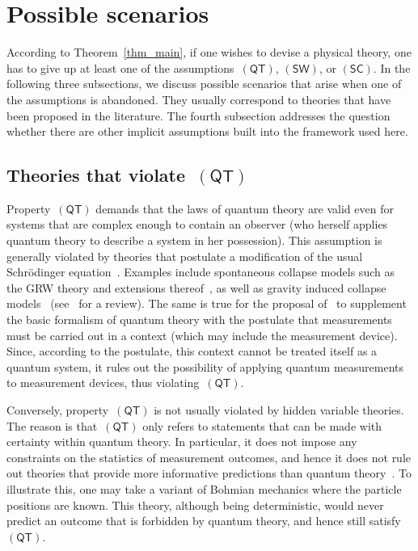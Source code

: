 \documentclass[12pt]{article}
\theoremstyle{plain}
\theoremstyle{definition}
\newcommand*{\QT}{\mathsf{(QT)}}
\newcommand*{\SW}{\mathsf{(SW)}}
\newcommand*{\SelfCons}{\mathsf{(SC)}}
\begin{document}
\section{Possible scenarios} \label{sec_discussion}

According to Theorem~\ref{thm_main}, if one wishes to devise a physical theory, one has to give up at least one of the assumptions~$\QT$, $\SW$, or $\SelfCons$.  In the following three subsections, we discuss possible scenarios that arise when one of the assumptions is abandoned. They usually correspond to theories that have been proposed in the literature. The fourth subsection addresses the question whether there are other implicit assumptions built into the framework used here. 


\subsection{Theories that violate~$\QT$} \label{sec_vQT}

Property~$\QT$ demands that the laws of quantum theory are valid even for systems that are complex enough to contain an observer (who herself applies quantum theory to describe a system in her possession). This assumption is generally violated by theories that postulate a modification of the usual Schr\"odinger equation~\cite{GisRig95,Weinberg12}. Examples include spontaneous collapse models such as the GRW theory and extensions thereof~\cite{GhRiWe86,Pearle89,Tumulka06}, as well as gravity induced collapse models~\cite{Karolyhazy66,Diosi89,Penrose96} (see~\cite{Bassietal13} for a review). The same is true for the proposal of~\cite{AufGra15} to supplement the basic formalism of quantum theory with the postulate that measurements must be carried out in a context (which may include the measurement device). Since, according to the postulate, this context cannot be treated itself as a quantum system, it rules out the possibility of applying quantum measurements to measurement devices, thus violating~$\QT$. 




Conversely, property~$\QT$ is not usually violated by hidden variable theories. The reason is that~$\QT$ only refers to statements that can be made with certainty within quantum theory. In particular, it does not impose any constraints on the statistics of measurement outcomes, and hence it does not rule out theories that provide more informative predictions than quantum theory~\cite{ColRen11}.  To illustrate this, one may take a variant of Bohmian mechanics where the particle positions are known. This theory, although being deterministic, would never predict an outcome that is forbidden by quantum theory, and hence still satisfy~$\QT$.
\end{document}
